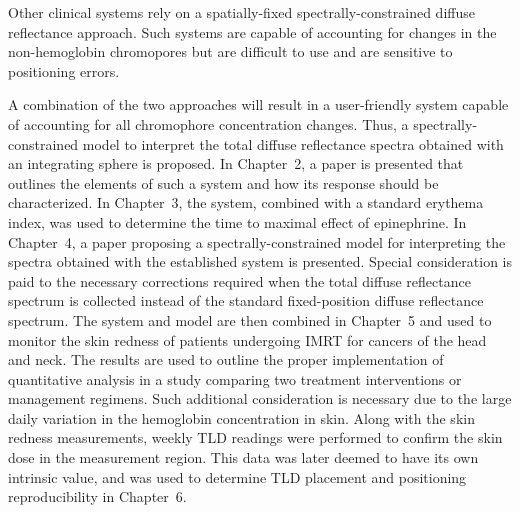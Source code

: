 Other clinical systems rely on a spatially-fixed spectrally-constrained diffuse reflectance approach. Such systems are capable of accounting for changes in the non-hemoglobin chromopores but are difficult to use and are sensitive to positioning errors.

A combination of the two approaches will result in a user-friendly system capable of accounting for all chromophore concentration changes. Thus, a spectrally-constrained model to interpret the total diffuse reflectance spectra obtained with an integrating sphere is proposed. In Chapter~2, a paper is presented that outlines the elements of such a system and how its response should be characterized. In Chapter~3, the system, combined with a standard erythema index, was used to determine the time to maximal effect of epinephrine. In Chapter~4, a paper proposing a spectrally-constrained model for interpreting the spectra obtained with the established system is presented. Special consideration is paid to the necessary corrections required when the total diffuse reflectance spectrum is collected instead of the standard fixed-position diffuse reflectance spectrum. The system and model are then combined in Chapter~5 and used to monitor the skin redness of patients undergoing IMRT for cancers of the head and neck. The results are used to outline the proper implementation of quantitative analysis in a study comparing two treatment interventions or management regimens. Such additional consideration is necessary due to the large daily variation in the hemoglobin concentration in skin. Along with the skin redness measurements, weekly TLD readings were performed to confirm the skin dose in the measurement region. This data was later deemed to have its own intrinsic value, and was used to determine TLD placement and positioning reproducibility in Chapter~6.